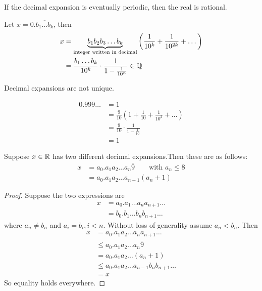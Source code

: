 If the decimal expansion is eventually periodic, then the real is rational.

\begin{ex}
	Let $x=0.\overline{b_1 \dots b_k}$, then
	\begin{align*}
	x & = \underbrace{b_1 b_2 b_3\dots b_k}_{\text{integer written in decimal}} \left( \frac 1 {10^k} + \frac 1 {10^{2k}} + \dots \right) \\
	& = \frac{b_1\dots b_k}{10^k} \cdot \frac 1 {1-\frac 1 {10^n}} \in \mathbb Q
	\end{align*}
\end{ex}

Decimal expansions are not unique.

\begin{ex}
	\begin{align*}
	0.999\dots & = 1 \\
	& = \frac 9 {10} \left(1 + \frac 1 {10} + \frac 1 {10^2} + \dots \right) \\
	& = \frac 9 {10} \cdot \frac 1 {1-\frac 1 {10}} \\
	& = 1
	\end{align*}
\end{ex}

\begin{pp}
	Suppose $x\in\mathbb R$ has two different decimal expansions.Then these are as follows:
	\begin{align*}
	x & = a_0.a_1 a_2 \dots a_n \overline 9 \qquad \text{with } a_n \le 8 \\
	& = a_0.a_1 a_2 \dots a_{n-1} (a_n+1)
	\end{align*}
\end{pp}

\begin{proof}
	Suppose the two expressions are 
	\begin{align*}
	x & = a_0.a_1 \dots a_n a_{n+1} \dots \\
	& = b_0.b_1 \dots b_n b_{n+1} \dots
	\end{align*}
	where $a_n \neq b_n$ and $a_i = b_i, i<n$. Without loss of generality assume $a_n < b_n$. Then
	\begin{align*}
	x & = a_0 . a_1 a_2 \dots a_n a_{n+1} \dots \\
	& \le a_0. a_1 a_2 \dots a_n \overline 9 \\
	& = a_0. a_1 a_2 \dots (a_n+1) \\
	& \le a_0. a_1 a_2 \dots a_{n-1} b_n b_{n+1} \dots \\
	& = x
	\end{align*}
	So equality holds everywhere.
\end{proof}






